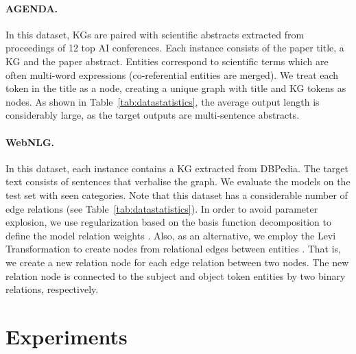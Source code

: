 \documentclass[11pt,a4paper]{article}
\begin{document}
\paragraph{AGENDA.} In this dataset, KGs are paired with scientific abstracts extracted from proceedings of 12 top AI conferences. Each instance consists of the paper title, a KG and the paper abstract. Entities correspond to scientific terms which are often multi-word expressions (co-referential entities are merged). We treat each token in the title as a node, creating a unique graph with title and KG tokens as nodes. As shown in Table~\ref{tab:datastatistics}, the average output length is considerably large, as the target outputs are multi-sentence abstracts. \paragraph{WebNLG.} In this dataset, each instance contains a KG extracted from DBPedia. The target text consists of sentences that verbalise the graph. We evaluate the models on the test set with seen categories. Note that this dataset has a considerable number of edge relations (see Table~\ref{tab:datastatistics}). In order to avoid parameter explosion, we use regularization based on the basis function decomposition to define the model relation weights \cite{Schlichtkrull2018ModelingRD}. Also, as an alternative, we employ the Levi Transformation to create nodes from relational edges between entities \cite{beck-etal-2018-acl2018}. That is, we create a new relation node for each edge relation between two nodes. The new relation node is connected to the subject and object token entities by two binary relations, respectively. 









 \section{Experiments}
\end{document}
